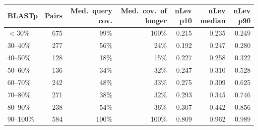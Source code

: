\begin{table}[htbp]
\centering
\caption{}
\label{tab:S6_forward}
\begin{tabular}{lrrrrrr}
\toprule
\textbf{BLASTp} & \textbf{Pairs} & \textbf{Med.\ query cov.} & \textbf{Med.\ cov.\ of longer} & \textbf{nLev p10} & \textbf{nLev median} & \textbf{nLev p90} \\
\midrule
$<$30\% & 675 & 99\% & 100\% & 0.215 & 0.235 & 0.249 \\
30--40\% & 277 & 56\% & 24\% & 0.192 & 0.247 & 0.280 \\
40--50\% & 128 & 18\% & 15\% & 0.227 & 0.258 & 0.322 \\
50--60\% & 136 & 34\% & 32\% & 0.247 & 0.310 & 0.528 \\
60--70\% & 242 & 48\% & 33\% & 0.275 & 0.309 & 0.625 \\
70--80\% & 271 & 38\% & 32\% & 0.293 & 0.345 & 0.746 \\
80--90\% & 238 & 54\% & 36\% & 0.307 & 0.442 & 0.856 \\
90--100\% & 584 & 100\% & 100\% & 0.809 & 0.962 & 0.989 \\
\bottomrule
\end{tabular}
\end{table}
